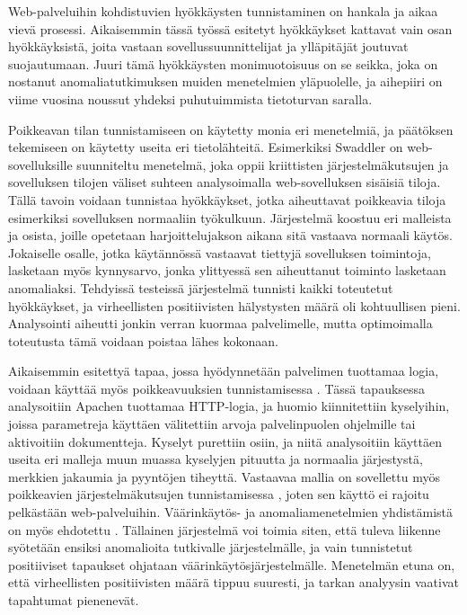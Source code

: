 Web-palveluihin kohdistuvien hyökkäysten tunnistaminen on hankala ja aikaa vievä prosessi. Aikaisemmin tässä työssä esitetyt hyökkäykset kattavat vain osan hyökkäyksistä, joita vastaan sovellussuunnittelijat ja
ylläpitäjät joutuvat suojautumaan. Juuri tämä hyökkäysten monimuotoisuus on se seikka, joka on nostanut anomaliatutkimuksen muiden menetelmien yläpuolelle, ja aihepiiri on viime vuosina noussut yhdeksi 
puhutuimmista tietoturvan saralla. 

Poikkeavan tilan tunnistamiseen on käytetty monia eri menetelmiä, ja päätöksen tekemiseen on käytetty useita eri tietolähteitä. Esimerkiksi Swaddler \cite{Swaddler} on 
web-sovelluksille suunniteltu menetelmä, joka oppii kriittisten järjestelmäkutsujen ja sovelluksen tilojen väliset suhteen analysoimalla web-sovelluksen sisäisiä tiloja. Tällä tavoin voidaan tunnistaa hyökkäykset,
jotka aiheuttavat poikkeavia tiloja esimerkiksi sovelluksen normaaliin työkulkuun. Järjestelmä koostuu eri malleista ja osista, joille opetetaan harjoittelujakson aikana sitä vastaava normaali käytös. Jokaiselle
osalle, jotka käytännössä vastaavat tiettyjä sovelluksen toimintoja, lasketaan myös kynnysarvo, jonka ylittyessä sen aiheuttanut toiminto lasketaan anomaliaksi. Tehdyissä testeissä järjestelmä tunnisti 
kaikki toteutetut hyökkäykset, ja virheellisten positiivisten hälystysten määrä oli kohtuullisen pieni. Analysointi aiheutti jonkin verran kuormaa palvelimelle, mutta optimoimalla toteutusta tämä voidaan poistaa
lähes kokonaan. 

Aikaisemmin esitettyä tapaa, jossa hyödynnetään palvelimen tuottamaa logia, voidaan käyttää myös poikkeavuuksien tunnistamisessa \cite{Multi}. Tässä tapauksessa analysoitiin Apachen tuottamaa HTTP-logia, ja huomio
kiinnitettiin kyselyihin, joissa parametreja käyttäen välitettiin arvoja palvelinpuolen ohjelmille tai aktivoitiin dokumentteja. Kyselyt purettiin osiin, ja niitä analysoitiin käyttäen useita eri malleja 
muun muassa kyselyjen pituutta ja normaalia järjestystä, merkkien jakaumia ja pyyntöjen tiheyttä. Vastaavaa mallia on sovellettu myös poikkeavien järjestelmäkutsujen tunnistamisessa \cite{SystemCall}, joten sen 
käyttö ei rajoitu pelkästään web-palveluihin. Väärinkäytös- ja anomaliamenetelmien yhdistämistä on myös ehdotettu \cite{Combination}. Tällainen järjestelmä voi toimia siten, että tuleva liikenne syötetään ensiksi 
anomalioita tutkivalle järjestelmälle, ja vain tunnistetut positiiviset tapaukset ohjataan väärinkäytösjärjestelmälle. Menetelmän etuna on, että virheellisten positiivisten määrä tippuu suuresti, ja tarkan 
analyysin vaativat tapahtumat pienenevät.


